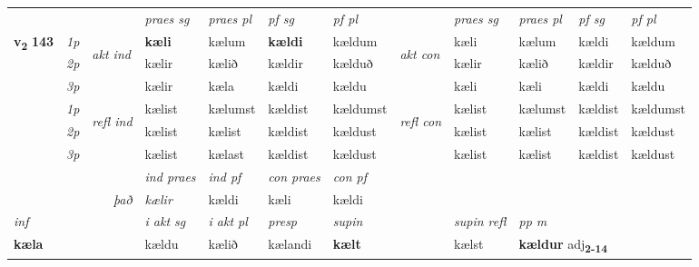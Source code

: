\begin{longtable}[l]{X>{\footnotesize\itshape}llXXXXlXXXX}
 & &   & \textit{praes sg}  & \textit{praes pl}    & \textit{ pf sg} & \textit{pf pl} & & \textit{praes sg}  & \textit{praes pl}    & \textit{pf sg} & \textit{pf pl }  \\ \cmidrule{4-7} \cmidrule{9-12}
 \multirow{2}{*}{{{\textbf{v{\textsubscript{2}}} \Large{\textbf{143}}}}}  & 1p & \multirow{3}{*}{\begin{turn}{90}\textit{akt ind}\end{turn}} & \textbf{kæli} & kælum & \textbf{kældi} & kældum & \multirow{3}{*}{\begin{turn}{90}\textit{akt con}\end{turn}} &kæli & kælum & kældi & kældum\\*
 & 2p &  &  kælir  & kælið & kældir & kælduð & & kælir & kælið & kældir & kælduð \\*
 & 3p &  & kælir & kæla & kældi & kældu & & kæli & kæli& kældi & kældu \\*
\cmidrule{4-7} \cmidrule{9-12}
 & 1p & \multirow{3}{*}{\begin{turn}{90}\textit{refl ind}\end{turn}}  & kælist & kælumst & kældist & kældumst & \multirow{3}{*}{\begin{turn}{90}\textit{refl con}\end{turn}}  &kælist & kælumst & kældist & kældumst \\*
 & 2p &  & kælist & kælist & kældist & kældust & &kælist & kælist & kældist & kældust \\*
 & 3p  & & kælist & kælast & kældist & kældust & & kælist & kælist& kældist & kældust \\*
\cmidrule{4-7} \cmidrule{9-12}

   && &  \textit{ind praes} & \textit{ind pf} & \textit{con praes} & \textit{con pf} \\*
\multicolumn{3}{r}{\textit{það}} & kælir & kældi & kæli & kældi \\*

\cmidrule{4-7}
   {\textit{inf}} & &  & \textit{i akt sg} & \textit{i akt pl}   & \textit{presp} & \textit{supin} && \textit{supin refl} & \textit{pp m} \\*
  {\textbf{kæla}} & && kældu  & kælið   & kælandi &  \textbf{kælt} && kælst & \multicolumn{2}{l}{\textbf{kældur} adj\textbf{\textsubscript{2-14}}} \\*


\end{longtable}
